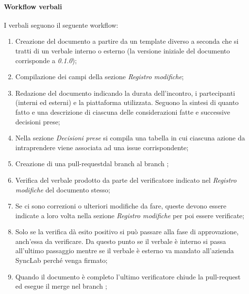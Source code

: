     \paragraph{Workflow verbali}
    I verbali seguono il seguente workflow:
    \begin{enumerate}
        \item Creazione del documento a partire da un template diverso a seconda che si tratti di un verbale interno o esterno (la versione iniziale del documento corrisponde a \textit{0.1.0});
        \item Compilazione dei campi della sezione \textit{Registro modifiche};
        \item Redazione del documento indicando la durata dell'incontro, i partecipanti (interni ed esterni) e la piattaforma utilizzata. Seguono la sintesi di quanto fatto e una descrizione di ciascuna 
        delle considerazioni fatte e successive decisioni prese;
        \item Nella sezione \textit{Decisioni prese} si compila una 
        tabella in cui ciascuna azione da intraprendere viene associata 
        ad una issue corrispondente;
        \item Creazione di una pull-requestdal branch  al branch ;
        \item Verifica del verbale prodotto da parte del verificatore 
        indicato nel \textit{Registro modifiche} del documento stesso;
        \item Se ci sono correzioni o ulteriori modifiche da fare, queste 
        devono essere indicate a loro volta nella sezione \textit{Registro modifiche} per poi essere verificate;
        \item Solo se la verifica dà esito positivo si può passare alla fase di approvazione, anch'essa da verificare. \newline Da questo punto se il verbale è interno si passa all'ultimo passaggio mentre se il verbale è esterno va mandato all'azienda SyncLab perché venga firmato;
        \item Quando il documento è completo l'ultimo verificatore 
        chiude la pull-request ed esegue il merge nel branch ;
    \end{enumerate}

